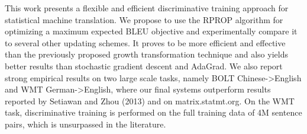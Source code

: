 This work presents a flexible and efficient discriminative training approach for statistical machine translation. We propose to use the RPROP algorithm for optimizing a maximum expected BLEU objective and experimentally compare it to several other updating schemes. It proves to be more efficient and effective than the previously proposed growth transformation technique and also yields better results than stochastic gradient descent and AdaGrad. We also report strong empirical results on two large scale tasks, namely BOLT Chinese->English and WMT German->English, where our final systems outperform results reported by Setiawan and Zhou (2013) and on matrix.statmt.org. On the WMT task, discriminative training is performed on the full training data of 4M sentence pairs, which is unsurpassed in the literature.
